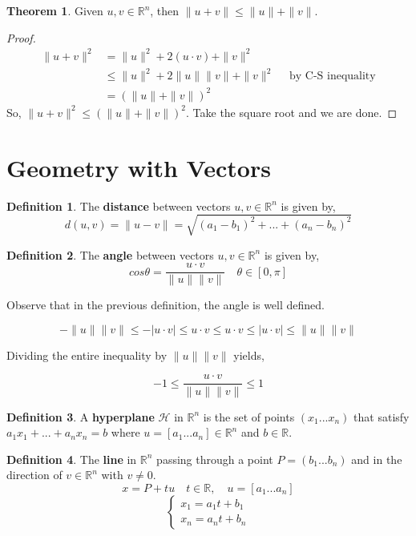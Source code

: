 \documentclass{report}
\theoremstyle{definition}
\newtheorem*{_def}{Definition}
\newtheorem{_thm}{Theorem}[section]
\theoremstyle{remark}
\begin{document}
\begin{_thm}
Given \(u,v\in \mathbb{R}^n\), then \(\|u+v\|\leq \|u\|+\|v\|\).
\end{_thm}

\begin{proof}
\begin{align*}
\|u+v\|^2 &= \|u\|^2+2(u\cdot v)+\|v\|^2 \\
&\leq \|u\|^2+2\|u\|\|v\|+\|v\|^2 \quad \text{ by C-S inequality} \\
&= (\|u\|+\|v\|)^2
\end{align*}
So, \(\|u+v\|^2\leq (\|u\|+\|v\|)^2\).
Take the square root and we are done.
\end{proof}

\section{Geometry with Vectors}

\begin{_def}
The \textbf{distance} between vectors \(u,v\in \mathbb{R}^n\) is given by,
\[d(u,v)=\|u-v\|=\sqrt{(a_1-b_1)^2+...+(a_n-b_n)^2}\]
\end{_def}

\begin{_def}
The \textbf{angle} between vectors \(u,v\in \mathbb{R}^n\) is given by,
\[cos\theta =\frac{u\cdot v}{\|u\|\|v\|} \quad \theta \in [0,\pi]\]
\end{_def}

Observe that in the previous definition, the angle is well defined.

\[-\|u\|\|v\|\leq -|u\cdot v|\leq u\cdot v\leq u\cdot v\leq |u\cdot v|\leq \|u\|\|v\|\]

Dividing the entire inequality by $\|u\|\|v\|$ yields,

\[-1\leq \frac{u\cdot v}{\|u\|\|v\|} \leq 1\]

\begin{_def}
A \textbf{hyperplane} $\mathcal{H}$ in $\mathbb{R}^n$ is the set of points $(x_1...x_n)$ that satisfy $a_1x_1+...+a_nx_n=b$ where $u=[a_1...a_n]\in \mathbb{R}^n$ and $b\in \mathbb{R}$.
\end{_def}

\begin{_def}
The \textbf{line} in $\mathbb{R}^n$ passing through a point $P=(b_1...b_n)$ and in the direction of $v\in \mathbb{R}^n$ with $v\neq 0$.
\[x=P+tu \quad t\in \mathbb{R}, \quad u=[a_1...a_n]\]
\[ \left\{ 
  \begin{array}{l}
    x_1=a_1t+b_1 \\
    x_n=a_nt+b_n
  \end{array} \right.\]
\end{_def}
\end{document}
